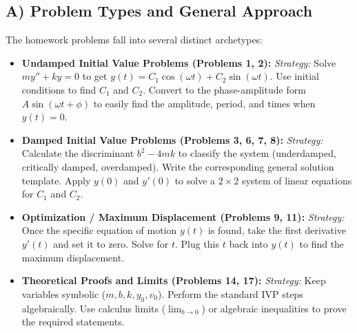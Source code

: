 \documentclass[11pt]{article}
\begin{document}
\subsection{A) Problem Types and General Approach}
The homework problems fall into several distinct archetypes:
\begin{itemize}
    \item \textbf{Undamped Initial Value Problems (Problems 1, 2):} 
    \textit{Strategy:} Solve $my'' + ky = 0$ to get $y(t) = C_1 \cos(\omega t) + C_2 \sin(\omega t)$. Use initial conditions to find $C_1$ and $C_2$. Convert to the phase-amplitude form $A \sin(\omega t + \phi)$ to easily find the amplitude, period, and times when $y(t) = 0$.
    \item \textbf{Damped Initial Value Problems (Problems 3, 6, 7, 8):} 
    \textit{Strategy:} Calculate the discriminant $b^2 - 4mk$ to classify the system (underdamped, critically damped, overdamped). Write the corresponding general solution template. Apply $y(0)$ and $y'(0)$ to solve a $2 \times 2$ system of linear equations for $C_1$ and $C_2$.
    \item \textbf{Optimization / Maximum Displacement (Problems 9, 11):} 
    \textit{Strategy:} Once the specific equation of motion $y(t)$ is found, take the first derivative $y'(t)$ and set it to zero. Solve for $t$. Plug this $t$ back into $y(t)$ to find the maximum displacement.
    \item \textbf{Theoretical Proofs and Limits (Problems 14, 17):} 
    \textit{Strategy:} Keep variables symbolic ($m, b, k, y_0, v_0$). Perform the standard IVP steps algebraically. Use calculus limits ($\lim_{b \to 0}$) or algebraic inequalities to prove the required statements.
\end{itemize}
\end{document}
